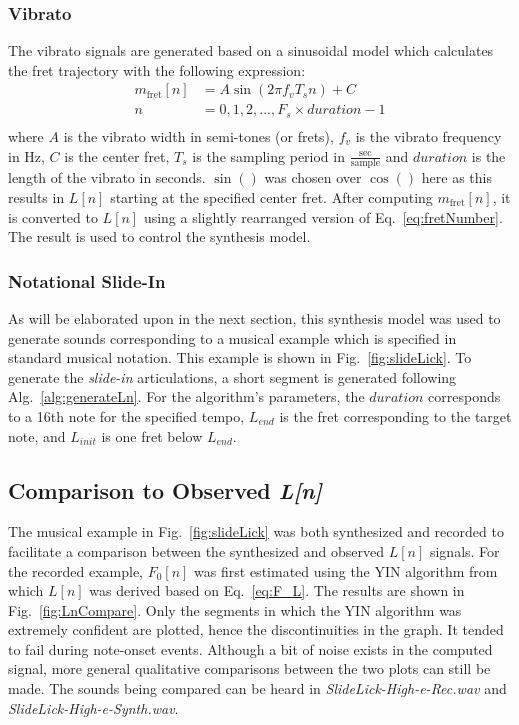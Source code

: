 \documentclass[../main.tex]{subfiles}
\begin{document}
\subsubsection{Vibrato}
The vibrato signals are generated based on a sinusoidal model which calculates the fret trajectory with the following expression:
\begin{align}
\label{eq:vib}
    m_{\text{fret}}[n] &= A\sin(2\pi f_v T_s n) + C\\
    n & = 0, 1, 2, ... , F_s\times  duration - 1\\
\end{align}
where $A$ is the vibrato width in semi-tones (or frets), $f_v$ is the vibrato frequency in Hz, $C$ is the center fret, $T_s$ is the sampling period in $\frac{\text{sec}}{\text{sample}}$ and $duration$ is the length of the vibrato in seconds. $\sin()$ was chosen over $\cos()$ here as this results in $L[n]$ starting at the specified center fret. After computing $m_{\text{fret}}[n]$, it is converted to $L[n]$ using a slightly rearranged version of Eq.~\ref{eq:fretNumber}. The result is used to control the synthesis model.

\subsubsection{Notational Slide-In}
As will be elaborated upon in the next section, this synthesis model was used to generate sounds corresponding to a musical example which is specified in standard musical notation. This example is shown in Fig.~\ref{fig:slideLick}. To generate the \emph{slide-in} articulations, a short segment is generated following Alg.~\ref{alg:generateLn}. For the algorithm's parameters, the $duration$ corresponds to a 16th note for the specified tempo, $L_{end}$ is the fret corresponding to the target note, and $L_{init}$ is one fret below $L_{end}$.

\subsection{Comparison to Observed \emph{L[n]}}
\label{subsec:Ch6LnCompare}
The musical example in Fig.~\ref{fig:slideLick} was both synthesized and recorded to facilitate a comparison between the synthesized and observed $L[n]$ signals. For the recorded example, $F_0[n]$ was first estimated using the YIN algorithm  from which $L[n]$ was derived based on Eq.~\ref{eq:F_L}. The results are shown in Fig.~\ref{fig:LnCompare}. Only the segments in which the YIN algorithm was extremely confident are plotted, hence the discontinuities in the graph. It tended to fail during note-onset events. Although a bit of noise exists in the computed signal, more general qualitative comparisons between the two plots can still be made. The sounds being compared can be heard in \emph{SlideLick-High-e-Rec.wav} and \emph{SlideLick-High-e-Synth.wav}.
\end{document}
